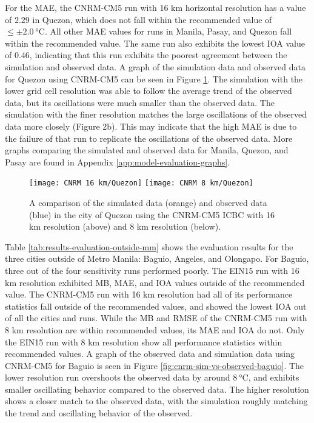 	For the MAE, the CNRM-CM5 run with 16 km horizontal resolution has a value of $2.29$ in Quezon, which does not fall within the recommended value of $\leq \pm \qty{2.0}{\degreeCelsius}$.
	All other MAE values for runs in Manila, Pasay, and Quezon fall within the recommended value.
	The same run also exhibits the lowest IOA value of $0.46$, indicating that this run exhibits the poorest agreement between the simulation and observed data.
	A graph of the simulation data and observed data for Quezon using CNRM-CM5 can be seen in Figure \ref{fig:cnrm-sim-vs-observed-quezon}. 
	The simulation with the lower grid cell resolution was able to follow the average trend of the observed data, but its oscillations were much smaller than the observed data.
	The simulation with the finer resolution matches the large oscillations of the observed data more closely (Figure 2b).
	This may indicate that the high MAE is due to the failure of that run to replicate the oscillations of the observed data.
	More graphs comparing the simulated and observed data for Manila, Quezon, and Pasay are found in Appendix \ref{app:model-evaluation-graphs}.

	
	\begin{figure}	
		\centering
		\texttt{[image: CNRM 16 km/Quezon]}
		\texttt{[image: CNRM 8 km/Quezon]}
		\caption{
			A comparison of the simulated data (orange) and observed data (blue) in the city of Quezon using the CNRM-CM5 ICBC with 16 km resolution (above) and 8 km resolution (below).
		}
		\label{fig:cnrm-sim-vs-observed-quezon}
	\end{figure}
	
	Table \ref{tab:results-evaluation-outside-mm} shows the evaluation results for the three cities outside of Metro Manila: Baguio, Angeles, and Olongapo.
	For Baguio, three out of the four sensitivity runs performed poorly.
	The EIN15 run with 16 km resolution exhibited MB, MAE, and IOA values outside of the recommended value.
	The CNRM-CM5 run with 16 km resolution had all of its performance statistics fall outside of the recommended values, and showed the lowest IOA out of all the cities and runs.
	While the MB and RMSE of the CNRM-CM5 run with 8 km resolution are within recommended values, its MAE and IOA do not.
	Only the EIN15 run with 8 km resolution show all performance statistics within recommended values.
	A graph of the observed data and simulation data using CNRM-CM5 for Baguio is seen in Figure \ref{fig:cnrm-sim-vs-observed-baguio}.
	The lower resolution run overshoots the observed data by around $\qty{8}{\degreeCelsius}$, and exhibits smaller oscillating behavior compared to the observed data.
	The higher resolution shows a closer match to the observed data, with the simulation roughly matching the trend and oscillating behavior of the observed.
		
